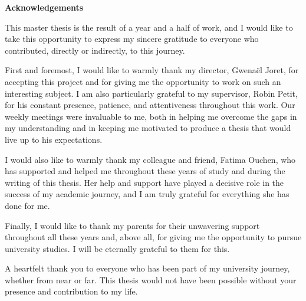 \vfill

\begin{center}
{\LARGE\bfseries Acknowledgements}
\end{center}

\vspace{1cm}

This master thesis is the result of a year and a half of work, and I would like to take this opportunity to express my sincere gratitude to everyone who contributed, directly or indirectly, to this journey.

First and foremost, I would like to warmly thank my director, Gwenaël Joret, for accepting this project and for giving me the opportunity to work on such an interesting subject. I am also particularly grateful to my supervisor, Robin Petit, for his constant presence, patience, and attentiveness throughout this work. Our weekly meetings were invaluable to me, both in helping me overcome the gaps in my understanding and in keeping me motivated to produce a thesis that would live up to his expectations.

I would also like to warmly thank my colleague and friend, Fatima Ouchen, who has supported and helped me throughout these years of study and during the writing of this thesis. Her help and support have played a decisive role in the success of my academic journey, and I am truly grateful for everything she has done for me.

Finally, I would like to thank my parents for their unwavering support throughout all these years and, above all, for giving me the opportunity to pursue university studies. I will be eternally grateful to them for this.

A heartfelt thank you to everyone who has been part of my university journey, whether from near or far. This thesis would not have been possible without your presence and contribution to my life.

\vfill